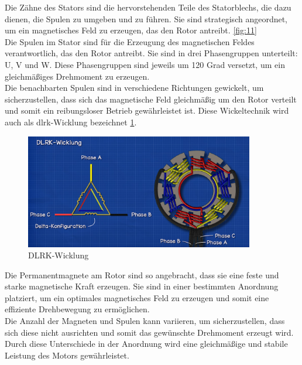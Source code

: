 Die Zähne des Stators sind die hervorstehenden Teile des Statorblechs, die dazu dienen, die Spulen zu umgeben und zu führen. Sie sind strategisch angeordnet, um ein magnetisches Feld zu erzeugen, das den Rotor antreibt.  \ref{fig:11}\\

Die Spulen im Stator sind für die Erzeugung des magnetischen Feldes verantwortlich, das den Rotor antreibt. Sie sind in drei Phasengruppen unterteilt: U, V und W. Diese Phasengruppen sind jeweils um 120 Grad versetzt, um ein gleichmäßiges Drehmoment zu erzeugen.\\

Die benachbarten Spulen sind in verschiedene Richtungen gewickelt, um sicherzustellen, dass sich das magnetische Feld gleichmäßig um den Rotor verteilt und somit ein reibungsloser Betrieb gewährleistet ist. Diese Wickeltechnik wird auch als dlrk-Wicklung bezeichnet \ref{fig:12}.\\

\begin{figure}[h]
    \centering
    \includegraphics[width=10cm]{images/DLRK-Wicklung.png}
    \caption{DLRK-Wicklung\cite{ingenieursmentalitat_burstenloser_2022}}%
    \label{fig:12}
\end{figure}

Die Permanentmagnete am Rotor sind so angebracht, dass sie eine feste und starke magnetische Kraft erzeugen. Sie sind in einer bestimmten Anordnung platziert, um ein optimales magnetisches Feld zu erzeugen und somit eine effiziente Drehbewegung zu ermöglichen.\\
Die Anzahl der Magneten und Spulen kann variieren, um sicherzustellen, dass sich diese nicht ausrichten und somit das gewünschte Drehmoment erzeugt wird. Durch diese Unterschiede in der Anordnung wird eine gleichmäßige und stabile Leistung des Motors gewährleistet.\\

